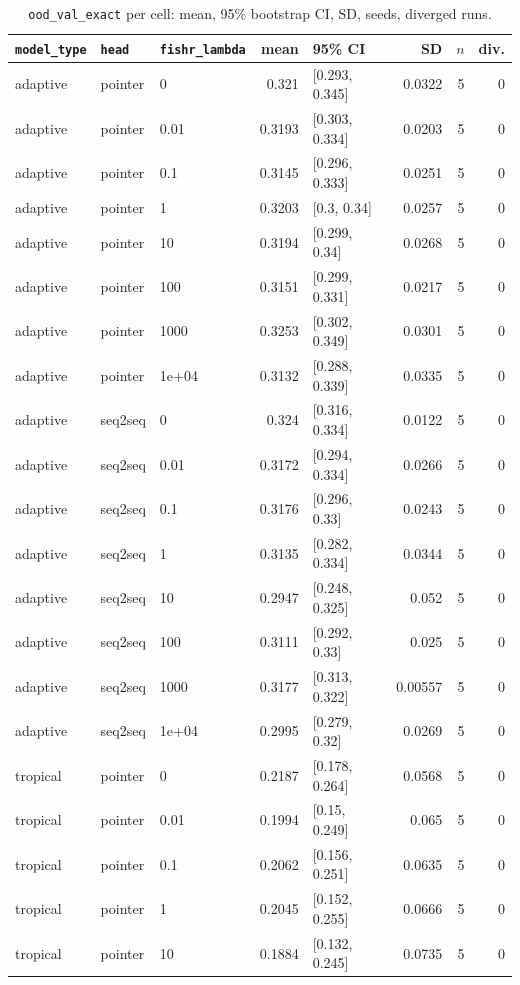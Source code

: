 \documentclass[10pt]{article}
\begin{document}
{\small
\begin{longtable}{lllrlrrr}
\caption{\texttt{ood\_val\_exact} per cell: mean, 95\% bootstrap CI, SD, seeds, diverged runs.}\label{tab:summary-ood_val_exact}\\
\toprule
\texttt{model\_type} & \texttt{head} & \texttt{fishr\_lambda} & mean & 95\% CI & SD & $n$ & div.\\
\midrule
\endhead
adaptive & pointer & 0 & 0.321 & [0.293, 0.345] & 0.0322 & 5 & 0\\
adaptive & pointer & 0.01 & 0.3193 & [0.303, 0.334] & 0.0203 & 5 & 0\\
adaptive & pointer & 0.1 & 0.3145 & [0.296, 0.333] & 0.0251 & 5 & 0\\
adaptive & pointer & 1 & 0.3203 & [0.3, 0.34] & 0.0257 & 5 & 0\\
adaptive & pointer & 10 & 0.3194 & [0.299, 0.34] & 0.0268 & 5 & 0\\
adaptive & pointer & 100 & 0.3151 & [0.299, 0.331] & 0.0217 & 5 & 0\\
adaptive & pointer & 1000 & 0.3253 & [0.302, 0.349] & 0.0301 & 5 & 0\\
adaptive & pointer & 1e+04 & 0.3132 & [0.288, 0.339] & 0.0335 & 5 & 0\\
adaptive & seq2seq & 0 & 0.324 & [0.316, 0.334] & 0.0122 & 5 & 0\\
adaptive & seq2seq & 0.01 & 0.3172 & [0.294, 0.334] & 0.0266 & 5 & 0\\
adaptive & seq2seq & 0.1 & 0.3176 & [0.296, 0.33] & 0.0243 & 5 & 0\\
adaptive & seq2seq & 1 & 0.3135 & [0.282, 0.334] & 0.0344 & 5 & 0\\
adaptive & seq2seq & 10 & 0.2947 & [0.248, 0.325] & 0.052 & 5 & 0\\
adaptive & seq2seq & 100 & 0.3111 & [0.292, 0.33] & 0.025 & 5 & 0\\
adaptive & seq2seq & 1000 & 0.3177 & [0.313, 0.322] & 0.00557 & 5 & 0\\
adaptive & seq2seq & 1e+04 & 0.2995 & [0.279, 0.32] & 0.0269 & 5 & 0\\
tropical & pointer & 0 & 0.2187 & [0.178, 0.264] & 0.0568 & 5 & 0\\
tropical & pointer & 0.01 & 0.1994 & [0.15, 0.249] & 0.065 & 5 & 0\\
tropical & pointer & 0.1 & 0.2062 & [0.156, 0.251] & 0.0635 & 5 & 0\\
tropical & pointer & 1 & 0.2045 & [0.152, 0.255] & 0.0666 & 5 & 0\\
tropical & pointer & 10 & 0.1884 & [0.132, 0.245] & 0.0735 & 5 & 0\\

\end{longtable}}
\end{document}
